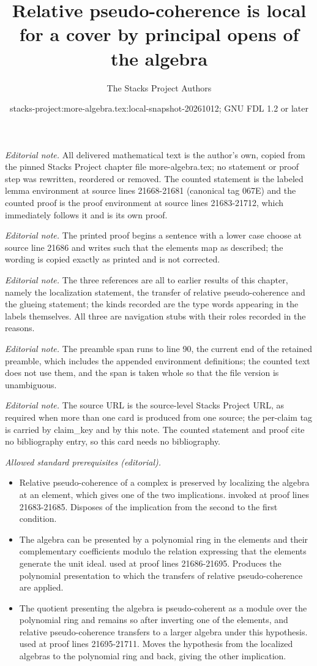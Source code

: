 \documentclass[10pt,a4paper]{amsart}
\title{Relative pseudo-coherence is local for a cover by principal opens of the algebra}
\author{The Stacks Project Authors}
\date{stacks-project:more-algebra.tex:local-snapshot-20261012; GNU FDL 1.2 or later}
\theoremstyle{plain}
\theoremstyle{definition}
\theoremstyle{remark}
\numberwithin{equation}{subsection}
\begin{document}
\maketitle
\setcounter{subsection}{1}
\noindent\textit{Editorial note.} All delivered mathematical text is the author's own, copied from the pinned Stacks Project chapter file more-algebra.tex; no statement or proof step was rewritten, reordered or removed. The counted statement is the labeled lemma environment at source lines 21668-21681 (canonical tag 067E) and the counted proof is the proof environment at source lines 21683-21712, which immediately follows it and is its own proof.\par\medskip
\noindent\textit{Editorial note.} The printed proof begins a sentence with a lower case choose at source line 21686 and writes such that the elements map as described; the wording is copied exactly as printed and is not corrected.\par\medskip
\noindent\textit{Editorial note.} The three references are all to earlier results of this chapter, namely the localization statement, the transfer of relative pseudo-coherence and the glueing statement; the kinds recorded are the type words appearing in the labels themselves. All three are navigation stubs with their roles recorded in the reasons.\par\medskip
\noindent\textit{Editorial note.} The preamble span runs to line 90, the current end of the retained preamble, which includes the appended environment definitions; the counted text does not use them, and the span is taken whole so that the file version is unambiguous.\par\medskip
\noindent\textit{Editorial note.} The source URL is the source-level Stacks Project URL, as required when more than one card is produced from one source; the per-claim tag is carried by claim\_key and by this note. The counted statement and proof cite no bibliography entry, so this card needs no bibliography.\par\medskip
\noindent\textit{Allowed standard prerequisites (editorial).}\begin{itemize}
\item Relative pseudo-coherence of a complex is preserved by localizing the algebra at an element, which gives one of the two implications. invoked at proof lines 21683-21685. Disposes of the implication from the second to the first condition.
\item The algebra can be presented by a polynomial ring in the elements and their complementary coefficients modulo the relation expressing that the elements generate the unit ideal. used at proof lines 21686-21695. Produces the polynomial presentation to which the transfers of relative pseudo-coherence are applied.
\item The quotient presenting the algebra is pseudo-coherent as a module over the polynomial ring and remains so after inverting one of the elements, and relative pseudo-coherence transfers to a larger algebra under this hypothesis. used at proof lines 21695-21711. Moves the hypothesis from the localized algebras to the polynomial ring and back, giving the other implication.
\end{itemize}\medskip
\end{document}
